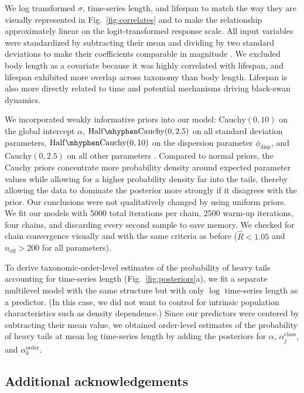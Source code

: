 We log transformed $\sigma$, time-series length, and lifespan to match the way
they are visually represented in Fig.~\ref{fig:correlates} and to make the
relationship approximately linear on the logit-transformed response scale. All
input variables were standardized by subtracting their mean and dividing by
two standard deviations to make their coefficients comparable in magnitude
\citep{gelman2008c}. We excluded body length as a covariate because it was
highly correlated with lifespan, and lifespan exhibited more overlap across
taxonomy than body length. Lifespan is also more directly related to time and
potential mechanisms driving black-swan dynamics.

We incorporated weakly informative priors into our model: $\mathrm{Cauchy}(0,
10)$ on the global intercept $\alpha$, $\mathrm{Half\mhyphen Cauchy}(0, 2.5)$
on all standard deviation parameters, $\mathrm{Half\mhyphen Cauchy}(0, 10)$ on
the dispersion parameter $\phi_\mathrm{disp}$, and $\mathrm{Cauchy}(0, 2.5)$
on all other parameters \citep{gelman2006c, gelman2008d}. Compared to normal
priors, the Cauchy priors concentrate more probability density around expected
parameter values while allowing for a higher probability density far into the
tails, thereby allowing the data to dominate the posterior more strongly if it
disagrees with the prior. Our conclusions were not qualitatively changed by
using uniform priors. We fit our models with 5000 total iterations per chain,
2500 warm-up iterations, four chains, and discarding every second sample to
save memory. We checked for chain convergence visually and with the same
criteria as before ($\widehat{R} < 1.05$ and $n_\mathrm{eff} >200$ for all
parameters).

To derive taxonomic-order-level estimates of the probability of heavy tails
accounting for time-series length (Fig.~\ref{fig:posteriors}a), we fit a
separate multilevel model with the same structure but with only $\log$
time-series length as a predictor. (In this case, we did not want to control
for intrinsic population characteristics such as density dependence.) Since
our predictors were centered by subtracting their mean value, we obtained
order-level estimates of the probability of heavy tails at mean log
time-series length by adding the posteriors for $\alpha$,
$\alpha^\mathrm{class}_j$, and $\alpha^\mathrm{order}_k$.

\subsection{Additional acknowledgements}

